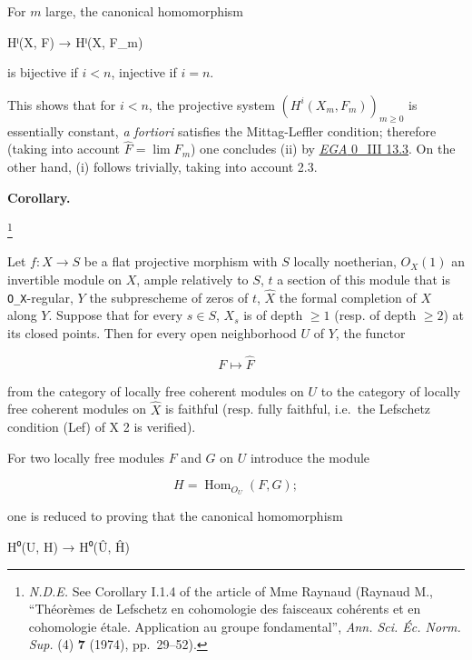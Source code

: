 \documentclass[
  11pt,
  a4paper,
]{book}
\newenvironment{Shaded}{}{}
\newcommand{\NormalTok}[1]{#1}
\begin{document}
For \(m\) large, the canonical homomorphism

\begin{Shaded}
\begin{Highlighting}[]
\NormalTok{Hⁱ(X, F) → Hⁱ(X, F\_m)}
\end{Highlighting}
\end{Shaded}

is bijective if \(i < n\), injective if \(i = n\).

This shows that for \(i < n\), the projective system
\((H^{i}(X_{m}, F_{m}))_{m\geqslant 0}\) is essentially constant,
\emph{a fortiori} satisfies the Mittag-Leffler condition; therefore
(taking into account \(\hat{F} = \lim F_{m}\)) one concludes (ii) by
\href{https://jcreinhold.github.io/ega/iii/06-ch0-13-projective-limits-homological-algebra.html\#133-application-cohomology-of-a-projective-limit-of-sheaves}{\emph{EGA}
0\_III 13.3}. On the other hand, (i) follows trivially, taking into
account 2.3.

\textbf{Corollary.}

\footnote{\emph{N.D.E.} See Corollary I.1.4 of the article of Mme
  Raynaud (Raynaud M., ``Théorèmes de Lefschetz en cohomologie des
  faisceaux cohérents et en cohomologie étale. Application au groupe
  fondamental'', \emph{Ann. Sci. Éc. Norm. Sup.} (4) \textbf{7} (1974),
  pp.~29--52).}

Let \(f: X \to S\) be a flat projective morphism with \(S\) locally
noetherian, \(O_{X}(1)\) an invertible module on \(X\), ample relatively
to \(S\), \(t\) a section of this module that is \texttt{O\_X}-regular,
\(Y\) the subprescheme of zeros of \(t\), \(\hat{X}\) the formal
completion of \(X\) along \(Y\). Suppose that for every \(s \in S\),
\(X_{s}\) is of depth \(\geqslant 1\) (resp. of depth \(\geqslant 2\))
at its closed points. Then for every open neighborhood \(U\) of \(Y\),
the functor

\[ F \mapsto \hat{F} \]

from the category of locally free coherent modules on \(U\) to the
category of locally free coherent modules on \(\hat{X}\) is faithful
(resp. fully faithful, i.e.~the Lefschetz condition (Lef) of X 2 is
verified).

For two locally free modules \(F\) and \(G\) on \(U\) introduce the
module

\[ H = \operatorname{Hom}_{O_{U}}(F, G); \]

one is reduced to proving that the canonical homomorphism

\begin{Shaded}
\begin{Highlighting}[]
\NormalTok{H⁰(U, H) → H⁰(Û, Ĥ)}
\end{Highlighting}
\end{Shaded}
\end{document}
